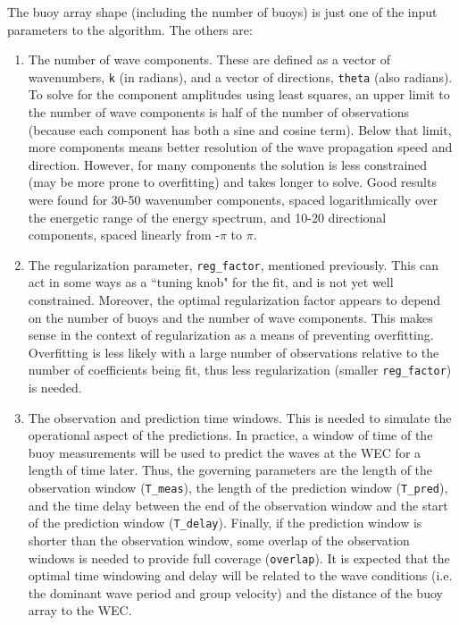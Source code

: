 \documentclass[11pt]{article}
\begin{document}
The buoy array shape (including the number of buoys) is just one of the input parameters to the algorithm.  The others are:
\begin{enumerate}
\item{The number of wave components.  These are defined as a vector of wavenumbers, \texttt{k} (in radians), and a vector of directions, \texttt{theta} (also radians).  To solve for the component amplitudes using least squares, an upper limit to the number of wave components is half of the number of observations (because each component has both a sine and cosine term).  Below that limit, more components means better resolution of the wave propagation speed and direction.  However, for many components the solution is less constrained (may be more prone to overfitting) and takes longer to solve.  Good results were found for 30-50 wavenumber components, spaced logarithmically over the energetic range of the energy spectrum, and 10-20 directional components, spaced linearly from -$\pi$ to $\pi$.}
\item{The regularization parameter, \texttt{reg\_factor}, mentioned previously.  This can act in some ways as a ``tuning knob" for the fit, and is not yet well constrained.  Moreover, the optimal regularization factor appears to depend on the number of buoys and the number of wave components.  This makes sense in the context of regularization as a means of preventing overfitting.  Overfitting is less likely with a large number of observations relative to the number of coefficients being fit, thus less regularization (smaller \texttt{reg\_factor}) is needed.}
\item{The observation and prediction time windows. This is needed to simulate the operational aspect of the predictions.  In practice, a window of time of the buoy measurements will be used to predict the waves at the WEC for a length of time later.  Thus, the governing parameters are the length of the observation window (\texttt{T\_meas}), the length of the prediction window (\texttt{T\_pred}), and the time delay between the end of the observation window and the start of the prediction window (\texttt{T\_delay}).  Finally, if the prediction window is shorter than the observation window, some overlap of the observation windows is needed to provide full coverage (\texttt{overlap}). It is expected that the optimal time windowing and delay will be related to the wave conditions (i.e. the dominant wave period and group velocity) and the distance of the buoy array to the WEC.}

\end{enumerate}
\end{document}
